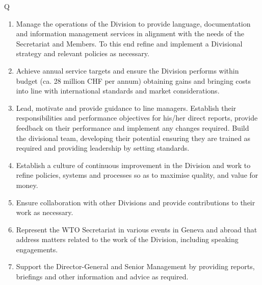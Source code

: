 \documentclass[output=paper]{langsci/langscibook}
\begin{document}
\begin{table}[t]	
\footnotesize
\begin{tabularx}{\textwidth}{Q}
 \lsptoprule
 \parbox{.9\textwidth}{

\begin{enumerate}
\item  Manage the operations of the Division to provide language, documentation and information management services in alignment with the needs of the Secretariat and Members. To this end refine and implement a Divisional strategy and relevant policies as necessary.\\ 
\item  Achieve annual service targets and ensure the Division performs within budget (ca. 28 million CHF per annum) obtaining  gains and bringing costs into line with international standards and market considerations.\\ 
\item  Lead, motivate and provide guidance to line managers. Establish their responsibilities and performance objectives for his/her direct reports, provide feedback on their performance and implement any changes required. Build the divisional team, developing their potential ensuring they are trained as required and providing leadership by setting standards.\\ 
\item  Establish a culture of continuous improvement in the Division and work to refine policies, systems and processes so as to maximise quality,  and value for money. \\ 
\item  Ensure collaboration with other Divisions and provide contributions to their work as necessary. \\ 
\item  Represent the WTO Secretariat in various events in Geneva and abroad that address matters related to the work of the Division, including speaking engagements.\\ 
\item  Support the Director-General and Senior Management by providing reports, briefings and other information and advice as required.
\end{enumerate}
}\\
\lspbottomrule
\end{tabularx} 
\caption{Duties of senior ITSM in representative vacancy notice}
\label{tab:prieto:3}
\end{table}
\end{document}
